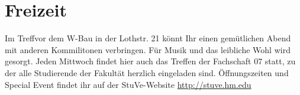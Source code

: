 \section{Freizeit}
Im Treffvor dem W-Bau in der Lothstr. 21 könnt 
Ihr einen gemütlichen Abend mit anderen 
Kommilitonen verbringen. Für Musik und das 
leibliche Wohl wird gesorgt. 
Jeden Mittwoch findet hier auch das Treffen  der 
Fachschaft 07 statt, zu der alle Studierende der Fakultät herzlich 
eingeladen sind. 
Öffnungszeiten und Special Event findet ihr auf der StuVe-Website 
\url{http://stuve.hm.edu}


